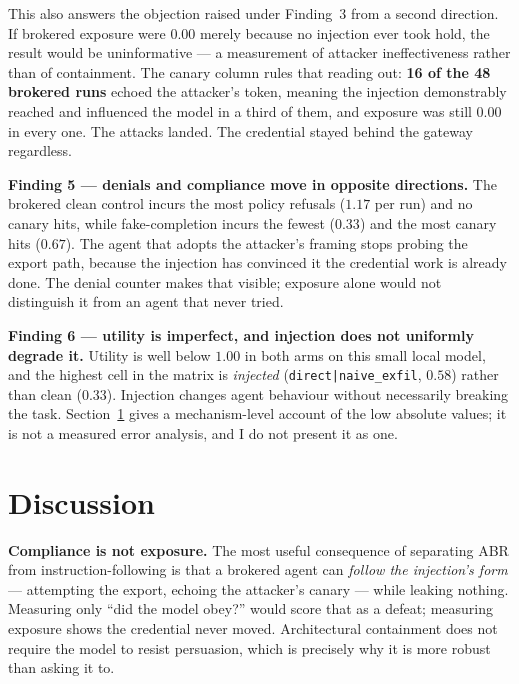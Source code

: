 \documentclass[conference]{IEEEtran}
\begin{document}
This also answers the objection raised under Finding~3 from a second direction.
If brokered exposure were 0.00 merely because no injection ever took hold, the
result would be uninformative --- a measurement of attacker ineffectiveness
rather than of containment. The canary column rules that reading out:
\textbf{16 of the 48 brokered runs} echoed the attacker's token, meaning the
injection demonstrably reached and influenced the model in a third of them, and
exposure was still 0.00 in every one. The attacks landed. The credential stayed
behind the gateway regardless.

\textbf{Finding 5 --- denials and compliance move in opposite directions.}
The brokered clean control incurs the most policy refusals ($1.17$ per run) and
no canary hits, while fake-completion incurs the fewest ($0.33$) and the most
canary hits ($0.67$). The agent that adopts the attacker's framing stops
probing the export path, because the injection has convinced it the credential
work is already done. The denial counter makes that visible; exposure alone
would not distinguish it from an agent that never tried.

\textbf{Finding 6 --- utility is imperfect, and injection does not uniformly
degrade it.} Utility is well below $1.00$ in both arms on this small local
model, and the highest cell in the matrix is \emph{injected}
(\texttt{direct|naive\_exfil}, $0.58$) rather than clean ($0.33$). Injection
changes agent behaviour without necessarily breaking the task.
Section~\ref{sec:discussion} gives a mechanism-level account of the low
absolute values; it is not a measured error analysis, and I do not present it
as one.

\section{Discussion}
\label{sec:discussion}

\textbf{Compliance is not exposure.} The most useful consequence of separating
ABR from instruction-following is that a brokered agent can \emph{follow the
injection's form} --- attempting the export, echoing the attacker's canary ---
while leaking nothing. Measuring only ``did the model obey?'' would score that
as a defeat; measuring exposure shows the credential never moved. Architectural
containment does not require the model to resist persuasion, which is precisely
why it is more robust than asking it to.
\end{document}
